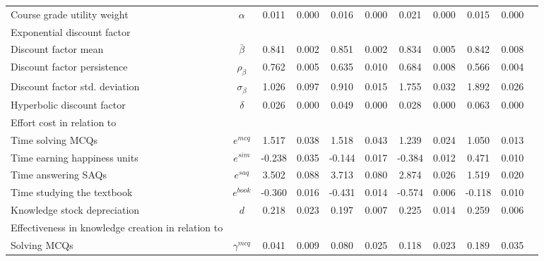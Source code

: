 \documentclass[12pt]{article}
\begin{document}
\begin{landscape}
\begin{table}[htbp]
\begin{tabular}{lcccccccccc}
                        Course grade utility weight &                       $\alpha$ &  0.011 & 0.000 &  0.016 & 0.000 &  0.021 & 0.000 &  0.015 & 0.000 \\
                 Exponential discount factor & & & & & & & & & \\
\hspace{0.4cm}Discount factor mean &                  $\bar{\beta}$ &  0.841 & 0.002 &  0.851 & 0.002 &  0.834 & 0.005 &  0.842 & 0.008 \\
          \hspace{0.4cm}Discount factor persistence &                 $\rho_{\beta}$ &  0.762 & 0.005 &  0.635 & 0.010 &  0.684 & 0.008 &  0.566 & 0.004 \\
       \hspace{0.4cm}Discount factor std. deviation &               $\sigma_{\beta}$ &  1.026 & 0.097 &  0.910 & 0.015 &  1.755 & 0.032 &  1.892 & 0.026 \\
                         Hyperbolic discount factor &                       $\delta$ &  0.026 & 0.000 &  0.049 & 0.000 &  0.028 & 0.000 &  0.063 & 0.000 \\
                    \hline
Effort cost in relation to & & & & & & & & & \\
\hspace{0.4cm}Time solving MCQs &                      $e^{mcq}$ &  1.517 & 0.038 &  1.518 & 0.043 &  1.239 & 0.024 &  1.050 & 0.013 \\
         \hspace{0.4cm}Time earning happiness units &                      $e^{sim}$ & -0.238 & 0.035 & -0.144 & 0.017 & -0.384 & 0.012 &  0.471 & 0.010 \\
                  \hspace{0.4cm}Time answering SAQs &                      $e^{saq}$ &  3.502 & 0.088 &  3.713 & 0.080 &  2.874 & 0.026 &  1.519 & 0.020 \\
           \hspace{0.4cm}Time studying the textbook &                     $e^{book}$ & -0.360 & 0.016 & -0.431 & 0.014 & -0.574 & 0.006 & -0.118 & 0.010 \\
                       Knowledge stock depreciation &                            $d$ &  0.218 & 0.023 &  0.197 & 0.007 &  0.225 & 0.014 &  0.259 & 0.006 \\
                         \hline
Effectiveness in knowledge creation in relation to & & & & & & & & & \\
\hspace{0.4cm}Solving MCQs &                 $\gamma^{mcq}$ &  0.041 & 0.009 &  0.080 & 0.025 &  0.118 & 0.023 &  0.189 & 0.035 \\

\end{tabular}
\end{table}
\end{landscape}
\end{document}
